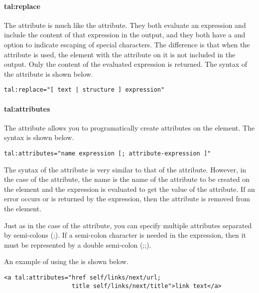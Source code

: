 \paragraph{tal:replace}

The  attribute is much like the 
attribute.  They both evaluate an expression and include the content
of that expression in the output, and they both have a  and
 option to indicate escaping of special characters.
The difference is that when the  attribute is used,
the element with the  attribute on it is not included
in the output.  Only the content of the evaluated expression is returned.
The syntax of the  attribute is shown below.
\begin{verbatim}
tal:replace="[ text | structure ] expression"
\end{verbatim}


\paragraph{tal:attributes}

The  attribute allows you to programatically create
attributes on the element.  The syntax is shown below.
\begin{verbatim}
tal:attributes="name expression [; attribute-expression ]"
\end{verbatim}

The syntax of the  attribute is very similar to
that of the  attribute.  However, in the case of the
 attribute, the name is the name of the attribute
to be created on the element and the expression is evaluated to
get the value of the attribute.  If an error occurs or  is 
returned by the expression, then the attribute is removed from the 
element.

Just as in the case of the  attribute, you can specify
multiple attributes separated by semi-colons (;).  If a semi-colon character
is needed in the expression, then it must be represented by a double
semi-colon (;;).

An example of using the  is shown below.
\begin{verbatim}
<a tal:attributes="href self/links/next/url; 
                   title self/links/next/title">link text</a>
\end{verbatim}


